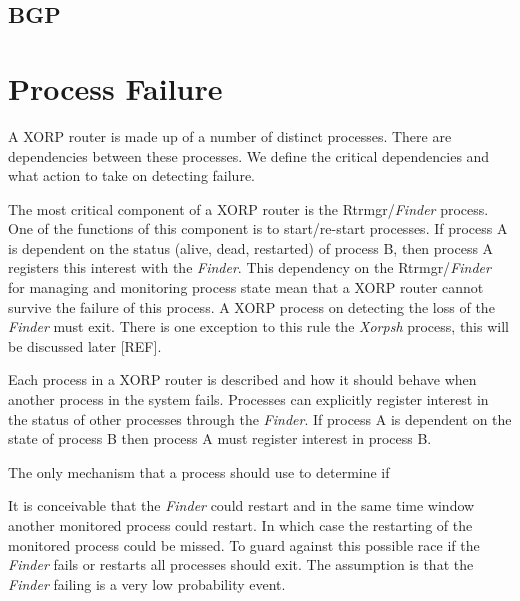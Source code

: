 \documentclass[11pt]{article}
\makeatletter
\newcommand{\finder} {{\em Finder}\@\xspace}
\newcommand{\xorpsh} {{\em Xorpsh}\@\xspace}
\makeatother
\begin{document}
\subsection{BGP}

\section{\label{pfailure}Process Failure}

A XORP router is made up of a number of distinct processes. There are
dependencies between these processes. We define the critical
dependencies and what action to take on detecting failure.

The most critical component of a XORP router is the Rtrmgr/\finder
process. One of the functions of this component is to start/re-start
processes. If process A is dependent on the status (alive, dead,
restarted) of process B, then process A registers this interest with
the \finder. This dependency on the Rtrmgr/\finder for managing and
monitoring process state mean that a XORP router cannot survive the
failure of this process. A XORP process on detecting the loss of the
\finder must exit. There is one exception to this rule the \xorpsh
process, this will be discussed later [REF].



Each process in a XORP router is described and how it should behave
when another process in the system fails. Processes can explicitly
register interest in the status of other processes through the
\finder. If process A is dependent on the state of process B then
process A must register interest in process B.

The only mechanism that a process should use to determine if 

It is conceivable that the \finder could restart and in the same time
window another monitored process could restart. In which case the
restarting of the monitored process could be missed. To guard against
this possible race if the \finder fails or restarts all processes
should exit. The assumption is that the \finder failing is a very low
probability event.
\end{document}
